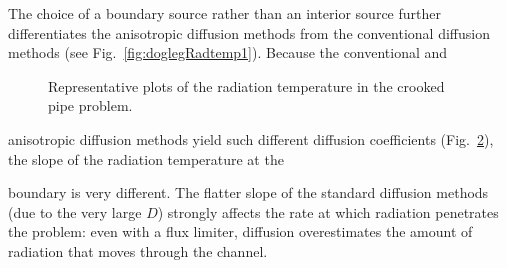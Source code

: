 The choice of a boundary source rather than an interior source further
differentiates the anisotropic diffusion methods from the conventional diffusion
methods (see Fig.~\ref{fig:doglegRadtemp1}). Because the conventional and
%
\begin{figure}[htb]
  \centering\small
  \subfloat[Leg 1 at $t=0.5$]{%
    \hspace{-.25in}%
    
    \label{fig:doglegRadtemp1}
  }%
  \subfloat[Leg 2 at $t=3.0$]{%
    \hspace{-.25in}%
    
    \label{fig:doglegRadtemp2}
  }%
  \caption{Representative plots of the radiation temperature in the crooked
  pipe problem.}
  \label{fig:doglegRadtemp}
\end{figure}
%
anisotropic diffusion methods yield such different diffusion coefficients
(Fig.~\ref{fig:doglegDcoeff}), the slope of the radiation temperature at the
%
\begin{figure}[htb]
  \centering\small
  \subfloat[Leg 1]{%
    \hspace{-.25in}%
    
  }%
  \subfloat[Leg 2]{%
    \hspace{-.25in}%
    
  }%
  \label{fig:doglegDcoeff}
\end{figure}
%
boundary is very different. The flatter slope of the standard
diffusion methods (due to the very large $D$) strongly affects the rate at which
radiation penetrates the problem: even with a flux limiter, diffusion
overestimates the amount of radiation that moves through the channel.

